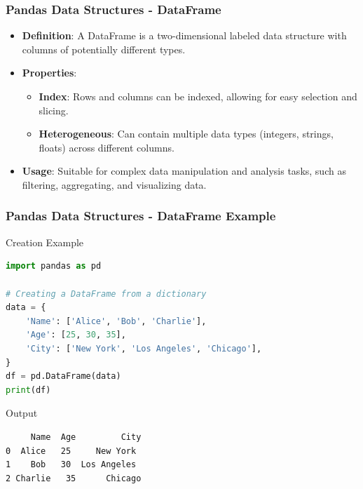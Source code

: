 \documentclass{beamer}
\begin{document}
\begin{frame}[fragile]
    \frametitle{Pandas Data Structures - DataFrame}
    \begin{itemize}
        \item \textbf{Definition}: A DataFrame is a two-dimensional labeled data structure with columns of potentially different types.
        
        \item \textbf{Properties}:
        \begin{itemize}
            \item \textbf{Index}: Rows and columns can be indexed, allowing for easy selection and slicing.
            \item \textbf{Heterogeneous}: Can contain multiple data types (integers, strings, floats) across different columns.
        \end{itemize}
        
        \item \textbf{Usage}: Suitable for complex data manipulation and analysis tasks, such as filtering, aggregating, and visualizing data.
    \end{itemize}
\end{frame}

\begin{frame}[fragile]
    \frametitle{Pandas Data Structures - DataFrame Example}
    \begin{block}{Creation Example}
        \begin{lstlisting}[language=Python]
import pandas as pd

# Creating a DataFrame from a dictionary
data = {
    'Name': ['Alice', 'Bob', 'Charlie'],
    'Age': [25, 30, 35],
    'City': ['New York', 'Los Angeles', 'Chicago'],
}
df = pd.DataFrame(data)
print(df)
        \end{lstlisting}
    \end{block}
    
    \begin{block}{Output}
        \begin{verbatim}
     Name  Age         City
0  Alice   25     New York
1    Bob   30  Los Angeles
2 Charlie   35      Chicago
        \end{verbatim}
    \end{block}
\end{frame}
\end{document}
